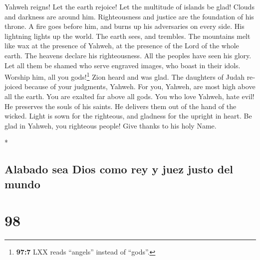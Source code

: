 \begin{paracol}{2}
\begin{otherlanguage}{english}
 Yahweh reigns! Let the earth rejoice! Let the multitude
of islands be glad!  Clouds and darkness are around him.
Righteousness and justice are the foundation of his throne.
 A fire goes before him, and burns up his adversaries on
every side.  His lightning lights up the world. The earth
sees, and trembles.  The mountains melt like wax at the
presence of Yahweh, at the presence of the Lord of the whole earth.
 The heavens declare his righteousness. All the peoples
have seen his glory.  Let all them be shamed who serve
engraved images, who boast in their idols. Worship him, all you
gods!\footnote{\textbf{97:7} LXX reads ``angels'' instead of ``gods''.}
 Zion heard and was glad. The daughters of Judah rejoiced
because of your judgments, Yahweh.  For you, Yahweh, are
most high above all the earth. You are exalted far above all gods.
 You who love Yahweh, hate evil! He preserves the souls
of his saints. He delivers them out of the hand of the wicked.
 Light is sown for the righteous, and gladness for the
upright in heart.  Be glad in Yahweh, you righteous
people! Give thanks to his holy Name.

\end{otherlanguage}

\switchcolumn[0]*

\hypertarget{alabado-sea-dios-como-rey-y-juez-justo-del-mundo}{%
\subsection{Alabado sea Dios como rey y juez justo del
mundo}\label{alabado-sea-dios-como-rey-y-juez-justo-del-mundo}}

\hypertarget{section-194}{%
\section{98}\label{section-194}}


\end{paracol}

